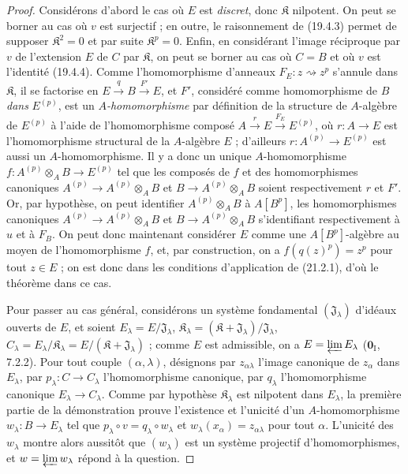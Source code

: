 \begin{proof}
Considérons d'abord le cas où $E$ est \emph{discret}, donc $\mathfrak K$ nilpotent.
On peut se borner au cas où $v$ est surjectif ; en outre, le raisonnement de
(19.4.3) permet de supposer $\mathfrak K^2=0$ et par suite $\mathfrak K^p=0$.
Enfin, en considérant l'image réciproque par $v$ de l'extension $E$ de $C$
par $\mathfrak K$, on peut se borner au cas où $C=B$ et où $v$ est l'identité
(19.4.4). Comme l'homomorphisme d'anneaux $F_E:z\rightsquigarrow z^p$
s'annule dans $\mathfrak K$, il se factorise en
$E\xrightarrow q B\xrightarrow{F'}E$,
et $F'$, considéré comme homomorphisme de $B$ \emph{dans} $E^{(p)}$, est un
\emph{$A$-homomorphisme} par définition de la structure de $A$-algèbre de $E^{(p)}$
à l'aide de l'homomorphisme composé
$A\xrightarrow r E\xrightarrow{F_E}E^{(p)}$, où $r:A\to E$ est l'homomorphisme
structural de la $A$-algèbre $E$ ; d'ailleurs
$r:A^{(p)}\to E^{(p)}$ est aussi un $A$-homomorphisme. Il y a donc un unique
$A$-homomorphisme $f:A^{(p)}\otimes_A B\to E^{(p)}$ tel que les composés de $f$
et des homomorphismes canoniques $A^{(p)}\to A^{(p)}\otimes_A B$ et
$B\to A^{(p)}\otimes_A B$ soient respectivement $r$ et $F'$. Or, par hypothèse,
on peut identifier $A^{(p)}\otimes_A B$ à $A[B^p]$, les homomorphismes canoniques
$A^{(p)}\to A^{(p)}\otimes_A B$ et $B\to A^{(p)}\otimes_A B$ s'identifiant
respectivement à $u$ et à $F_B$. On peut donc maintenant considérer $E$ comme
une $A[B^p]$-algèbre au moyen de l'homomorphisme $f$, et, par construction, on a
$f(q(z)^p)=z^p$ pour tout $z\in E$ ; on est donc dans les conditions
d'application de (21.2.1), d'où le théorème dans ce cas.

Pour passer au cas général, considérons un système fondamental
$(\mathfrak J_\lambda)$ d'idéaux ouverts de $E$, et soient
$E_\lambda=E/\mathfrak J_\lambda$,
$\mathfrak K_\lambda=(\mathfrak K+\mathfrak J_\lambda)/\mathfrak J_\lambda$,
$C_\lambda=E_\lambda/\mathfrak K_\lambda=E/(\mathfrak K+\mathfrak J_\lambda)$ ;
comme $E$ est admissible, on a $E=\varprojlim E_\lambda$ ($\mathbf{0}_{\mathrm I}$, 7.2.2).
Pour tout couple $(\alpha,\lambda)$, désignons par $z_{\alpha\lambda}$
l'image canonique de $z_\alpha$ dans $E_\lambda$, par
$p_\lambda:C\to C_\lambda$ l'homomorphisme canonique,
par $q_\lambda$ l'homomorphisme canonique $E_\lambda\to C_\lambda$.
Comme par hypothèse $\mathfrak K_\lambda$ est nilpotent dans $E_\lambda$,
la première partie de la démonstration prouve l'existence et l'unicité d'un
$A$-homomorphisme $w_\lambda:B\to E_\lambda$ tel que
$p_\lambda\circ v=q_\lambda\circ w_\lambda$ et
$w_\lambda(x_\alpha)=z_{\alpha\lambda}$ pour tout $\alpha$.
L'unicité des $w_\lambda$ montre alors aussitôt que $(w_\lambda)$ est un
système projectif d'homomorphismes, et $w=\varprojlim w_\lambda$ répond
à la question.
\end{proof}

